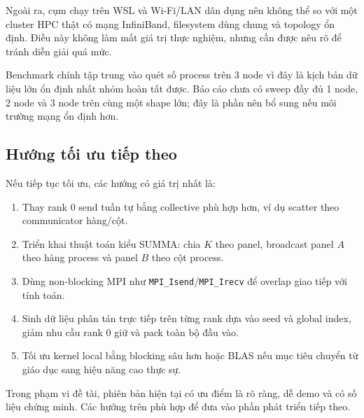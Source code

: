 \documentclass[12pt,a4paper]{article}
\newcommand{\code}[1]{\texttt{#1}}
\begin{document}
Ngoài ra, cụm chạy trên WSL và Wi-Fi/LAN dân dụng nên không thể so với một cluster HPC thật có mạng InfiniBand, filesystem dùng chung và topology ổn định. Điều này không làm mất giá trị thực nghiệm, nhưng cần được nêu rõ để tránh diễn giải quá mức.

Benchmark chính tập trung vào quét số process trên 3 node vì đây là kịch bản dữ liệu lớn ổn định nhất nhóm hoàn tất được. Báo cáo chưa có sweep đầy đủ 1 node, 2 node và 3 node trên cùng một shape lớn; đây là phần nên bổ sung nếu môi trường mạng ổn định hơn.

\subsection{Hướng tối ưu tiếp theo}
Nếu tiếp tục tối ưu, các hướng có giá trị nhất là:
\begin{enumerate}
  \item Thay rank 0 send tuần tự bằng collective phù hợp hơn, ví dụ scatter theo communicator hàng/cột.
  \item Triển khai thuật toán kiểu SUMMA: chia $K$ theo panel, broadcast panel $A$ theo hàng process và panel $B$ theo cột process.
  \item Dùng non-blocking MPI như \code{MPI\_Isend}/\code{MPI\_Irecv} để overlap giao tiếp với tính toán.
  \item Sinh dữ liệu phân tán trực tiếp trên từng rank dựa vào seed và global index, giảm nhu cầu rank 0 giữ và pack toàn bộ đầu vào.
  \item Tối ưu kernel local bằng blocking sâu hơn hoặc BLAS nếu mục tiêu chuyển từ giáo dục sang hiệu năng cao thực sự.
\end{enumerate}

Trong phạm vi đề tài, phiên bản hiện tại có ưu điểm là rõ ràng, dễ demo và có số liệu chứng minh. Các hướng trên phù hợp để đưa vào phần phát triển tiếp theo.
\end{document}
